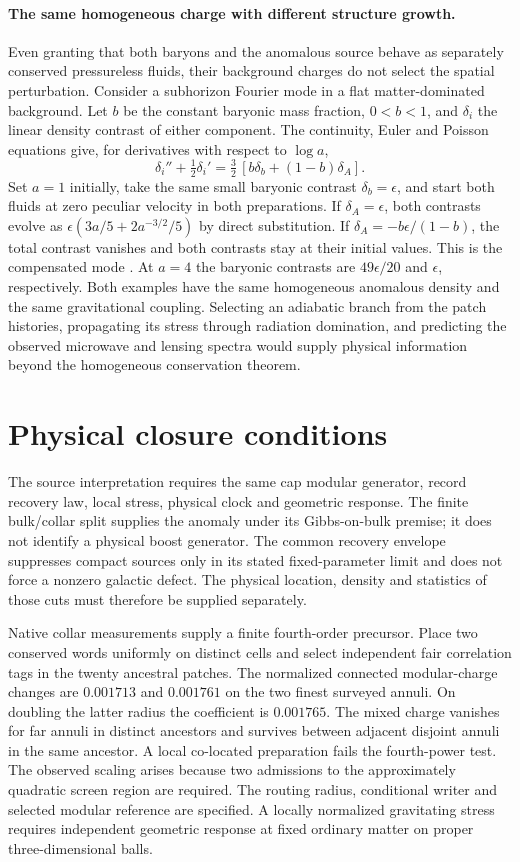 \documentclass[11pt]{article}
\begin{document}
\paragraph{The same homogeneous charge with different structure growth.}
Even granting that both baryons and the anomalous source behave as
separately conserved pressureless fluids, their background charges do
not select the spatial perturbation. Consider a subhorizon Fourier
mode in a flat matter-dominated background. Let $b$ be the constant
baryonic mass fraction, $0<b<1$, and $\delta_i$ the linear density
contrast of either component. The continuity, Euler and Poisson
equations give, for derivatives with respect to $\log a$,
\[
 \delta_i''+\tfrac12\delta_i'
    =\tfrac32\,[b\delta_b+(1-b)\delta_A].
\]
Set $a=1$ initially, take the same small baryonic contrast
$\delta_b=\epsilon$, and start both fluids at zero peculiar velocity
in both preparations. If $\delta_A=\epsilon$, both contrasts evolve
as $\epsilon(3a/5+2a^{-3/2}/5)$ by direct substitution. If
$\delta_A=-b\epsilon/(1-b)$, the total contrast vanishes and both
contrasts stay at their initial values. This is the compensated mode
\cite{grinCompensated}. At $a=4$ the baryonic contrasts are
$49\epsilon/20$ and $\epsilon$, respectively. Both examples have the
same homogeneous anomalous density and the same gravitational coupling.
Selecting an adiabatic branch from the patch histories, propagating its
stress through radiation domination, and predicting the observed
microwave and lensing spectra would supply physical information beyond
the homogeneous conservation theorem.

\section{Physical closure conditions}
\label{sec:open}
The source interpretation requires the same cap modular generator, record
recovery law, local stress, physical clock and geometric response. The finite
bulk/collar split supplies the anomaly under its Gibbs-on-bulk premise;
it does not identify a physical boost generator. The common recovery envelope
suppresses compact sources only in its stated fixed-parameter limit and does
not force a nonzero galactic defect. The physical location, density and
statistics of those cuts must therefore be supplied separately.

Native collar measurements supply a finite fourth-order precursor.
Place two conserved words uniformly on distinct cells and select
independent fair correlation tags in the twenty ancestral patches.
The normalized connected modular-charge changes are $0.001713$ and
$0.001761$ on the two finest surveyed annuli. On doubling the latter
radius the coefficient is $0.001765$. The mixed charge vanishes for
far annuli in distinct ancestors and survives between adjacent
disjoint annuli in the same ancestor. A local co-located preparation
fails the fourth-power test. The observed scaling arises because two
admissions to the approximately quadratic screen region are required.
The routing radius, conditional writer and selected modular reference
are specified. A locally normalized gravitating stress requires
independent geometric response at fixed ordinary matter on proper
three-dimensional balls.
\end{document}
